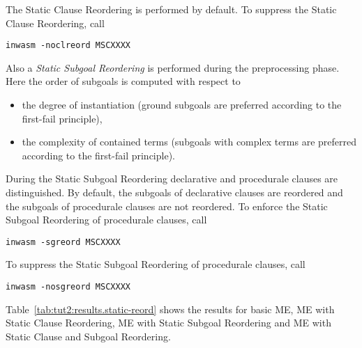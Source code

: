 The Static Clause Reordering is performed by default. To suppress the
Static Clause Reordering, call
\begin{center}
\begin{verbatim}
inwasm -noclreord MSCXXXX
\end{verbatim}
\end{center}

Also a {\em Static Subgoal Reordering\/} is performed during the
preprocessing phase. Here the order of subgoals is computed with
respect to  
\begin{itemize}
\item the degree of instantiation (ground subgoals are preferred
	according to the first-fail principle),
\item the complexity of contained terms (subgoals with complex
	terms are preferred according to the first-fail principle).  
\end{itemize}

During the Static Subgoal Reordering declarative and procedurale
clauses are distinguished. By default, the subgoals of declarative
clauses are reordered and the subgoals of procedurale clauses are not
reordered. To enforce the Static Subgoal Reordering of procedurale
clauses, call
\begin{center}
\begin{verbatim}
inwasm -sgreord MSCXXXX
\end{verbatim}
\end{center}
To suppress the Static Subgoal Reordering of procedurale clauses, call
\begin{center}
\begin{verbatim}
inwasm -nosgreord MSCXXXX
\end{verbatim}
\end{center}

Table~\ref{tab:tut2:results.static-reord} shows the results for basic
ME, ME with Static Clause Reordering, ME with Static Subgoal
Reordering and ME with Static Clause and Subgoal Reordering.

